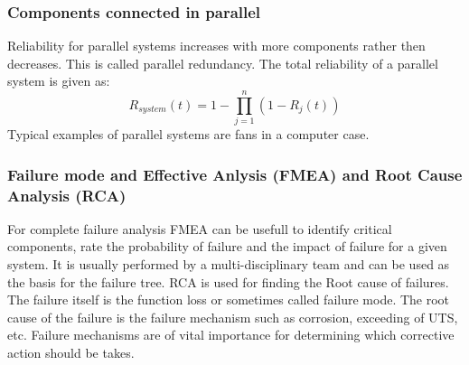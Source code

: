 \documentclass[11pt, a4paper]{article}
\numberwithin{equation}{section}
\numberwithin{figure}{section}
\begin{document}
\subsubsection{Components connected in parallel}
Reliability for parallel systems increases with more components rather then decreases. This is called parallel redundancy. The total reliability of a parallel system is given as:
\begin{equation}
  R_{system}(t) = 1 - \prod_{j=1}^n (1 - R_j(t))
\end{equation}
Typical examples of parallel systems are fans in a computer case.


\subsubsection{Failure mode and Effective Anlysis (FMEA) and Root Cause Analysis (RCA)}
For complete failure analysis FMEA can be usefull to identify critical components, rate the probability of failure and the impact of failure for a given system. It is usually performed by a multi-disciplinary team and can be used as the basis for the failure tree.
RCA is used for finding the Root cause of failures. The failure itself is the function loss or sometimes called failure mode. The root cause of the failure is the failure mechanism such as corrosion, exceeding of UTS, etc. Failure mechanisms are of vital importance for determining which corrective action should be takes.
\end{document}
